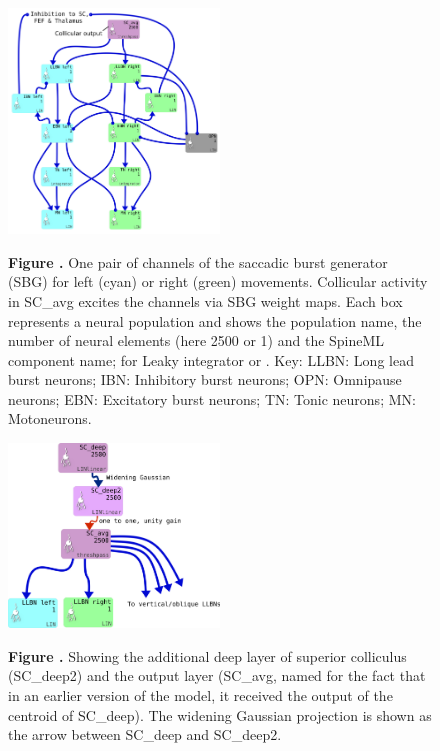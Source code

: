 \documentclass{frontiersSCNS}
\begin{document}
\begin{figure}[htb!]
\begin{center}
\includegraphics[width=0.5\textwidth]{./figures/Brain_Stem_1channel.png}
\end{center}
\textbf{\label{sbg} Figure .}
{ One pair of channels of the saccadic burst
generator (SBG) for left (cyan) or right (green) movements. Collicular
activity in SC\_avg excites the channels via SBG weight maps. Each box
represents a neural population and shows the population name, the
number of neural elements (here 2500 or 1) and the SpineML component
name;  for Leaky integrator or . Key: LLBN:
Long lead burst neurons; IBN: Inhibitory burst neurons; OPN: Omnipause
neurons; EBN: Excitatory burst neurons; TN: Tonic neurons; MN:
Motoneurons.}
\end{figure}

\begin{figure}[htb!]
\begin{center}
\includegraphics[width=0.5\textwidth]{./figures/SC_to_brainstem.png}
\end{center}
\textbf{\label{scdeep} Figure .}
{ Showing the additional deep layer of superior colliculus
(SC\_deep2) and the output layer (SC\_avg, named for the fact that in an earlier
version of the model, it received the output of the centroid of SC\_deep).
The widening Gaussian projection is shown as the arrow between SC\_deep
and SC\_deep2.}
\end{figure}
\end{document}
